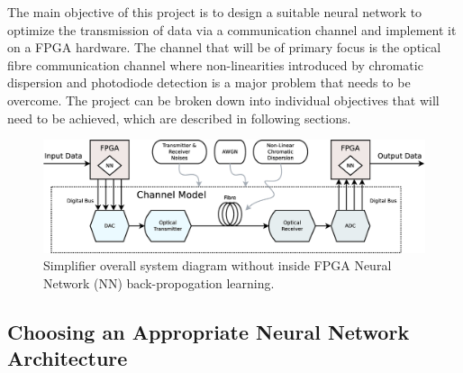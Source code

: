 The main objective of this project is to design a suitable neural network to optimize the transmission of data via a communication channel and implement it on a FPGA hardware. The channel that will be of primary focus is the optical fibre communication channel where non-linearities introduced by chromatic dispersion and photodiode detection is a major problem that needs to be overcome. The project can be broken down into individual objectives that will need to be achieved, which are described in following sections.

\begin{figure}[h!]
	\centering
	\includegraphics[width=\linewidth]{graphics/overall_diagram2.eps}
	\caption{Simplifier overall system diagram without inside FPGA Neural Network (NN) back-propogation learning.}
	\label{fig:overall}	
\end{figure}

\subsection{Choosing an Appropriate Neural Network Architecture}

